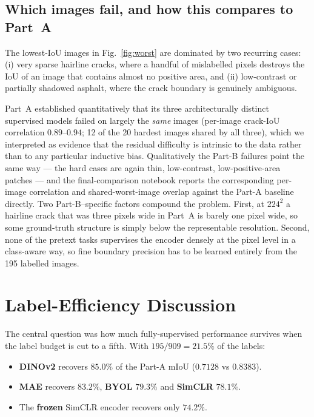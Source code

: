 \documentclass[conference]{IEEEtran}
\begin{document}
\subsection{Which images fail, and how this compares to Part~A}
The lowest-IoU images in Fig.~\ref{fig:worst} are dominated by two recurring cases:
(i) very sparse hairline cracks, where a handful of mislabelled pixels destroys the
IoU of an image that contains almost no positive area, and (ii) low-contrast or
partially shadowed asphalt, where the crack boundary is genuinely ambiguous.

Part~A established quantitatively that its three architecturally distinct supervised
models failed on largely the \emph{same} images (per-image crack-IoU correlation
$0.89$--$0.94$; 12 of the 20 hardest images shared by all three), which we
interpreted as evidence that the residual difficulty is intrinsic to the data rather
than to any particular inductive bias. Qualitatively the Part-B failures point the
same way --- the hard cases are again thin, low-contrast, low-positive-area patches
--- and the final-comparison notebook reports the corresponding per-image correlation
and shared-worst-image overlap against the Part-A baseline directly. Two
Part-B--specific factors compound the problem. First, at $224^2$ a hairline crack that was three
pixels wide in Part~A is barely one pixel wide, so some ground-truth structure is
simply below the representable resolution. Second, none of the pretext tasks
supervises the encoder densely at the pixel level in a class-aware way, so fine
boundary precision has to be learned entirely from the 195 labelled images.

\section{Label-Efficiency Discussion}

The central question was how much fully-supervised performance survives when the
label budget is cut to a fifth. With $195/909 = 21.5\%$ of the labels:

\begin{itemize}
  \item \textbf{DINOv2} recovers $85.0\%$ of the Part-A mIoU
        ($0.7128$ vs $0.8383$).
  \item \textbf{MAE} recovers $83.2\%$, \textbf{BYOL} $79.3\%$ and
        \textbf{SimCLR} $78.1\%$.
  \item The \textbf{frozen} SimCLR encoder recovers only $74.2\%$.
\end{itemize}
\end{document}
